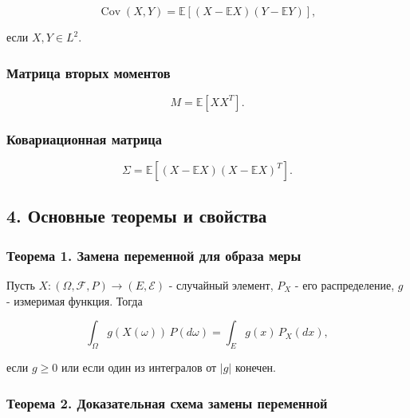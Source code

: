 \documentclass[
  11pt,
  a4paper,
]{article}
\begin{document}
\[
\operatorname{Cov}(X,Y)
=
\mathbb E[(X-\mathbb EX)(Y-\mathbb EY)],
\]

если \(X,Y\in L^2\).

\subsubsection{Матрица вторых
моментов}\label{ux43cux430ux442ux440ux438ux446ux430-ux432ux442ux43eux440ux44bux445-ux43cux43eux43cux435ux43dux442ux43eux432}

\[
M=\mathbb E[XX^T].
\]

\subsubsection{Ковариационная
матрица}\label{ux43aux43eux432ux430ux440ux438ux430ux446ux438ux43eux43dux43dux430ux44f-ux43cux430ux442ux440ux438ux446ux430}

\[
\Sigma=\mathbb E[(X-\mathbb EX)(X-\mathbb EX)^T].
\]

\subsection{4. Основные теоремы и
свойства}\label{ux43eux441ux43dux43eux432ux43dux44bux435-ux442ux435ux43eux440ux435ux43cux44b-ux438-ux441ux432ux43eux439ux441ux442ux432ux430}

\subsubsection{Теорема 1. Замена переменной для образа
меры}\label{ux442ux435ux43eux440ux435ux43cux430-1.-ux437ux430ux43cux435ux43dux430-ux43fux435ux440ux435ux43cux435ux43dux43dux43eux439-ux434ux43bux44f-ux43eux431ux440ux430ux437ux430-ux43cux435ux440ux44b}

Пусть \(X:(\Omega,\mathcal F,P)\to(E,\mathcal E)\) - случайный элемент,
\(P_X\) - его распределение, \(g\) - измеримая функция. Тогда

\[
\int_\Omega g(X(\omega))\,P(d\omega)
=
\int_E g(x)\,P_X(dx),
\]

если \(g\ge0\) или если один из интегралов от \(|g|\) конечен.

\subsubsection{Теорема 2. Доказательная схема замены
переменной}\label{ux442ux435ux43eux440ux435ux43cux430-2.-ux434ux43eux43aux430ux437ux430ux442ux435ux43bux44cux43dux430ux44f-ux441ux445ux435ux43cux430-ux437ux430ux43cux435ux43dux44b-ux43fux435ux440ux435ux43cux435ux43dux43dux43eux439}
\end{document}
